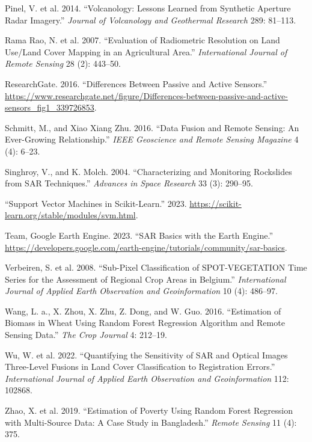 \documentclass[
  letterpaper,
  DIV=11,
  numbers=noendperiod]{scrreprt}
\newlength{\cslhangindent}
\newenvironment{CSLReferences}[2] %
 {\begin{list}{}{%
  \setlength{\itemindent}{0pt}
  \setlength{\leftmargin}{0pt}
  \setlength{\parsep}{0pt}
  \ifodd #1
   \setlength{\leftmargin}{\cslhangindent}
   \setlength{\itemindent}{-1\cslhangindent}
  \fi
  \setlength{\itemsep}{#2\baselineskip}}}
 {\end{list}}
\begin{document}
\begin{CSLReferences}{1}{0}
Pinel, V. et al. 2014. {``Volcanology: Lessons Learned from Synthetic
Aperture Radar Imagery.''} \emph{Journal of Volcanology and Geothermal
Research} 289: 81--113.

Rama Rao, N. et al. 2007. {``Evaluation of Radiometric Resolution on
Land Use/Land Cover Mapping in an Agricultural Area.''}
\emph{International Journal of Remote Sensing} 28 (2): 443--50.

ResearchGate. 2016. {``Differences Between Passive and Active
Sensors.''}
\url{https://www.researchgate.net/figure/Differences-between-passive-and-active-sensors_fig1_339726853}.

Schmitt, M., and Xiao Xiang Zhu. 2016. {``Data Fusion and Remote
Sensing: An Ever-Growing Relationship.''} \emph{IEEE Geoscience and
Remote Sensing Magazine} 4 (4): 6--23.

Singhroy, V., and K. Molch. 2004. {``Characterizing and Monitoring
Rockslides from SAR Techniques.''} \emph{Advances in Space Research} 33
(3): 290--95.

{``Support Vector Machines in Scikit-Learn.''} 2023.
\url{https://scikit-learn.org/stable/modules/svm.html}.

Team, Google Earth Engine. 2023. {``SAR Basics with the Earth Engine.''}
\url{https://developers.google.com/earth-engine/tutorials/community/sar-basics}.

Verbeiren, S. et al. 2008. {``Sub-Pixel Classification of
SPOT-VEGETATION Time Series for the Assessment of Regional Crop Areas in
Belgium.''} \emph{International Journal of Applied Earth Observation and
Geoinformation} 10 (4): 486--97.

Wang, L. a., X. Zhou, X. Zhu, Z. Dong, and W. Guo. 2016. {``Estimation
of Biomass in Wheat Using Random Forest Regression Algorithm and Remote
Sensing Data.''} \emph{The Crop Journal} 4: 212--19.

Wu, W. et al. 2022. {``Quantifying the Sensitivity of SAR and Optical
Images Three-Level Fusions in Land Cover Classification to Registration
Errors.''} \emph{International Journal of Applied Earth Observation and
Geoinformation} 112: 102868.

Zhao, X. et al. 2019. {``Estimation of Poverty Using Random Forest
Regression with Multi-Source Data: A Case Study in Bangladesh.''}
\emph{Remote Sensing} 11 (4): 375.

\end{CSLReferences}
\end{document}
